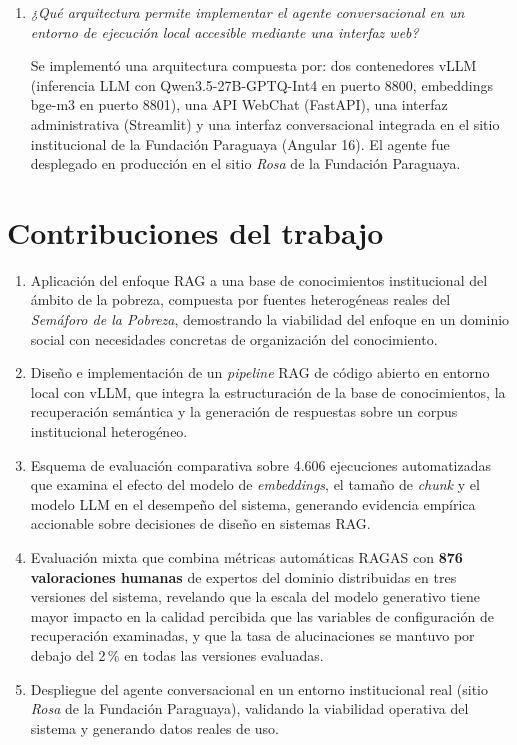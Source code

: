 \begin{enumerate}
\item \textit{¿Qué arquitectura permite implementar el agente conversacional en un entorno de ejecución local accesible mediante una interfaz web?}

Se implementó una arquitectura compuesta por: dos contenedores vLLM (inferencia LLM con Qwen3.5-27B-GPTQ-Int4 en puerto 8800, embeddings bge-m3 en puerto 8801), una API WebChat (FastAPI), una interfaz administrativa (Streamlit) y una interfaz conversacional integrada en el sitio institucional de la Fundación Paraguaya (Angular 16). El agente fue desplegado en producción en el sitio \textit{Rosa} de la Fundación Paraguaya.

\end{enumerate}

\section{Contribuciones del trabajo}\label{sec:contribuciones}

\begin{enumerate}

\item Aplicación del enfoque RAG a una base de conocimientos institucional del ámbito de la pobreza, compuesta por fuentes heterogéneas reales del \textit{Semáforo de la Pobreza}, demostrando la viabilidad del enfoque en un dominio social con necesidades concretas de organización del conocimiento.

\item Diseño e implementación de un \textit{pipeline} RAG de código abierto en entorno local con vLLM, que integra la estructuración de la base de conocimientos, la recuperación semántica y la generación de respuestas sobre un corpus institucional heterogéneo.

\item Esquema de evaluación comparativa sobre 4.606 ejecuciones automatizadas que examina el efecto del modelo de \textit{embeddings}, el tamaño de \textit{chunk} y el modelo LLM en el desempeño del sistema, generando evidencia empírica accionable sobre decisiones de diseño en sistemas RAG.

\item Evaluación mixta que combina métricas automáticas RAGAS con \textbf{876 valoraciones humanas} de expertos del dominio distribuidas en tres versiones del sistema, revelando que la escala del modelo generativo tiene mayor impacto en la calidad percibida que las variables de configuración de recuperación examinadas, y que la tasa de alucinaciones se mantuvo por debajo del 2\,\% en todas las versiones evaluadas.

\item Despliegue del agente conversacional en un entorno institucional real (sitio \textit{Rosa} de la Fundación Paraguaya), validando la viabilidad operativa del sistema y generando datos reales de uso.

\end{enumerate}

